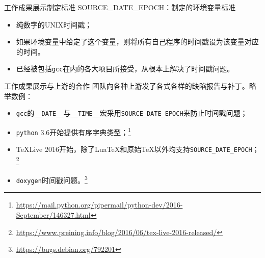 \documentclass{beamer}
\begin{document}
\begin{frame}[t]{工作成果展示}{制定标准}
{\Large SOURCE\_DATE\_EPOCH：制定的环境变量标准}

\vspace{1em}
\begin{itemize}
\item 纯数字的UNIX时间戳；
\item 如果环境变量中给定了这个变量，则将所有自己程序的时间戳设为该变量对应的时间。\cite{debian-reproduciblebuilds-sourcedateepoch}
\item 已经被包括\texttt{gcc}在内的各大项目所接受，从根本上解决了时间戳问题。
\end{itemize}
\end{frame}
\begin{frame}[t]{工作成果展示}{与上游的合作}
团队向各种上游发了各式各样的缺陷报告与补丁。略举数例：

\vspace{1em}
\begin{itemize}
\item \texttt{gcc}的\texttt{\_\_DATE\_\_}与\texttt{\_\_TIME\_\_}宏采用\texttt{SOURCE\_DATE\_EPOCH}来防止时间戳问题；
\item \texttt{python} 3.6开始提供有序字典类型；\footnote{\url{https://mail.python.org/pipermail/python-dev/2016-September/146327.html}}
\item \TeX{}Live 2016开始，除了Lua\TeX{}和原始\TeX{}以外均支持\texttt{SOURCE\_DATE\_EPOCH}；\footnote{\url{https://www.preining.info/blog/2016/06/tex-live-2016-released/}}
\item \texttt{doxygen}时间戳问题。\footnote{\url{https://bugs.debian.org/792201}}
\end{itemize}
\end{frame}
\end{document}
